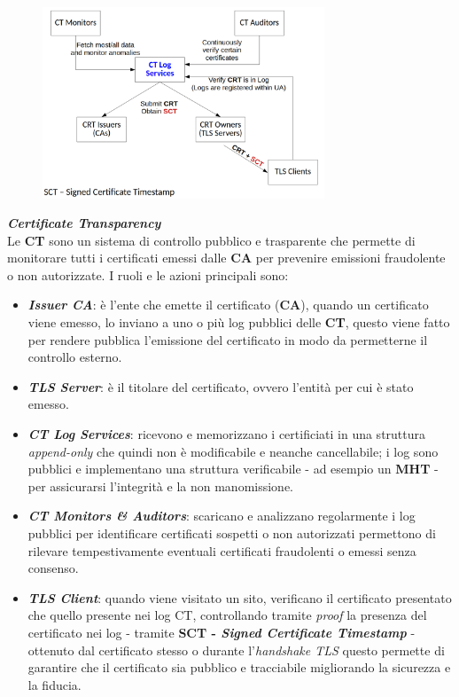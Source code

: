 \begin{flushleft}
    \begin{figure}[h]
        \centering
        \includegraphics[width=0.75\textwidth]{img/ct_arc.png}
    \end{figure}

    \textbf{\textit{Certificate Transparency}} \\
    Le \textbf{CT} sono un sistema di controllo pubblico e trasparente che permette di monitorare tutti i certificati emessi dalle \textbf{CA} per prevenire emissioni fraudolente o non autorizzate. I ruoli e le azioni principali sono:
    \begin{itemize}[nosep]
        \item \textbf{\textit{Issuer CA}}: è l'ente che emette il certificato (\textbf{CA}), quando un certificato viene emesso, lo inviano a uno o più log pubblici delle \textbf{CT}, questo viene fatto per rendere pubblica l'emissione del certificato in modo da permetterne il controllo esterno.
        \item \textbf{\textit{TLS Server}}: è il titolare del certificato, ovvero l'entità per cui è stato emesso.
        \item \textbf{\textit{CT Log Services}}: ricevono e memorizzano i certificiati in una struttura \textit{append-only} che quindi non è modificabile e neanche cancellabile; i log sono pubblici e implementano una struttura verificabile - ad esempio un \textbf{MHT} - per assicurarsi l'integrità e la non manomissione.
        \item \textbf{\textit{CT Monitors \& Auditors}}: scaricano e analizzano regolarmente i log pubblici per identificare certificati sospetti o non autorizzati permettono di rilevare tempestivamente eventuali certificati fraudolenti o emessi senza consenso.
        \item \textbf{\textit{TLS Client}}: quando viene visitato un sito, verificano il certificato presentato che quello presente nei log CT, controllando tramite \textit{proof} la presenza del certificato nei log - tramite \textbf{SCT - \textit{Signed Certificate Timestamp}} - ottenuto dal certificato stesso o durante l'\textit{handshake TLS} questo permette di garantire che il certificato sia pubblico e tracciabile migliorando la sicurezza e la fiducia.
    \end{itemize}

\end{flushleft}